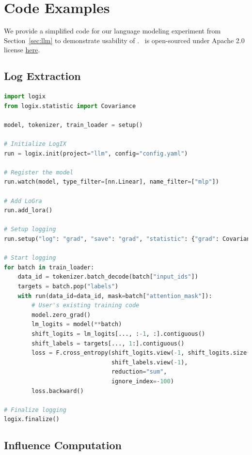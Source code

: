 \clearpage

\section{Code Examples}
\label{sec:code}
We provide a simplified code for our language modeling experiment from Section~\ref{sec:llm} to demonstrate usability of \software. \software\ is open-sourced under Apache 2.0 license \href{https://github.com/logix-project/logix}{here}. 

\subsection{Log Extraction}

\begin{lstlisting}[language=Python]
import logix
from logix.statistic import Covariance

model, tokenizer, train_loader = setup()

# Initialize LogIX
run = logix.init(project="llm", config="config.yaml")

# Register the model
run.watch(model, type_filter=[nn.Linear], name_filter=["mlp"])

# Add LoGra
run.add_lora()

# Setup logging
run.setup("log": "grad", "save": "grad", "statistic": {"grad": Covariance})

# Start logging
for batch in train_loader:
    data_id = tokenizer.batch_decode(batch["input_ids"])
    targets = batch.pop("labels")
    with run(data_id=data_id, mask=batch["attention_mask"]):
        # User's existing training code
        model.zero_grad()
        lm_logits = model(**batch)
        shift_logits = lm_logits[..., :-1, :].contiguous()
        shift_labels = targets[..., 1:].contiguous()
        loss = F.cross_entropy(shift_logits.view(-1, shift_logits.size(-1)),
                               shift_labels.view(-1),
                               reduction="sum",
                               ignore_index=-100)
        loss.backward()

# Finalize logging
logix.finalize()
\end{lstlisting}

\subsection{Influence Computation}

